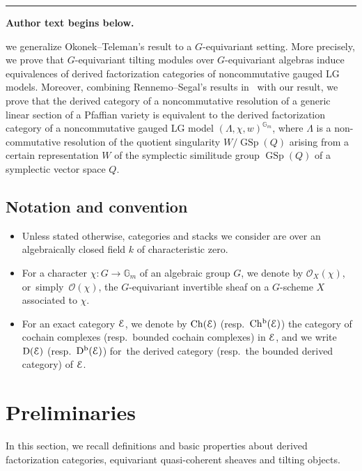\documentclass[11pt]{article}
\numberwithin{equation}{section}
\numberwithin{equation}{section}
\newcommand{\Ch}{\operatorname{Ch}}
\newcommand{\Chb}{\operatorname{Ch^{b}}}
\newcommand{\Db}{\operatorname{D^b}}
\newcommand{\D}{\operatorname{D}}
\newcommand{\GSp}{\operatorname{GSp}}
\newcommand{\cO}{\mathcal{O}}
\newcommand{\bG}{\mathbb{G}}
\newcommand{\scrE}{\EuScript{E}}
\begin{document}
\medskip\hrule\medskip\noindent\textbf{Author text begins below.}\par
\setcounter{section}{1}
we generalize Okonek--Teleman's result to a $G$-equivariant setting. More precisely, we prove that $G$-equivariant tilting modules over $G$-equivariant algebras induce equivalences of derived factorization categories of noncommutative gauged LG models. Moreover, combining Rennemo--Segal's results in~\cite{rs} with our result, we prove that the derived category of a noncommutative resolution of a generic linear section of a Pfaffian variety is equivalent to the derived factorization category of a noncommutative gauged LG model $(\Lambda, \chi, w)^{\mathbb{G}_m}$, where $\Lambda$ is a non-commutative resolution of the quotient singularity $W/\GSp(Q)$ arising from a certain representation $W$ of the symplectic similitude group $\GSp(Q)$ of a symplectic vector space $Q$.

\setcounter{subsection}{3}
\subsection{Notation and convention}
\begin{itemize}\itemsep=0pt

\item Unless stated otherwise, categories and stacks we consider are over an algebraically closed field $k$ of characteristic zero.

\item For a character $\chi\colon G\to \bG_m$ of an algebraic group $G$, we denote by $\cO_X(\chi)$, or~sim\-ply~$\cO(\chi)$, the $G$-equivariant invertible sheaf on a $G$-scheme $X$ associated to $\chi$.

\item For an exact category $\scrE$, we denote by $\Ch(\scrE)$ (resp.\ $\Chb(\scrE)$) the category of cochain complexes (resp.\ bounded cochain complexes) in $\scrE$, and we write $\D(\scrE)$ (resp.\ $\Db(\scrE)$) for~the derived category (resp.\ the bounded derived category) of $\scrE$.
\end{itemize}

\section{Preliminaries}%
In this section, we recall definitions and basic properties about derived factorization categories, equivariant quasi-coherent sheaves and tilting objects.
\end{document}
